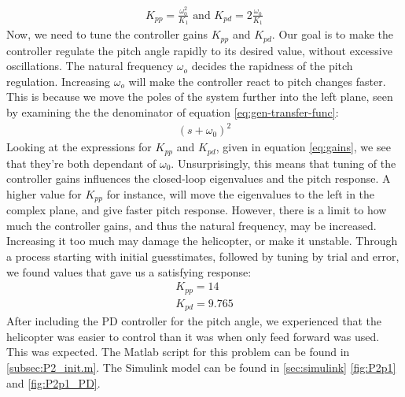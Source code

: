 \begin{gather}
    K_{pp} = \frac{\omega_0^2}{K_1} \text{ and } K_{pd} = 2 \frac{\omega_0}{K_1}
    \label{eq:gains}
\end{gather}
Now, we need to tune the controller gains $K_{pp}$ and $K_{pd}$. Our goal is to make the controller regulate the pitch angle rapidly to its desired value, without excessive oscillations. The natural frequency $\omega_o$ decides the rapidness of the pitch regulation. Increasing $\omega_o$ will make the controller react to pitch changes faster. This is because we move the poles of the system further into the left plane, seen by examining the the denominator of equation \eqref{eq:gen-transfer-func}:
\begin{gather*}
    (s + \omega_0)^2
\end{gather*}
 Looking at the expressions for  $K_{pp}$ and $K_{pd}$, given in equation \eqref{eq:gains}, we see that they're both dependant of $\omega_0$. Unsurprisingly, this means that tuning of the controller gains influences the closed-loop eigenvalues and the pitch response. A higher value for $K_{pp}$ for instance, will move the eigenvalues to the left in the complex plane, and give faster pitch response. However, there is a limit to how much the controller gains, and thus the natural frequency, may be increased. Increasing it too much may damage the helicopter, or make it unstable. 
 Through a process starting with initial guesstimates, followed by tuning by trial and error, we found values that gave us a satisfying response:
\begin{gather*}
    K_{pp} = 14 \\ 
    K_{pd} = 9.765
\end{gather*}
After including the PD controller for the pitch angle, we experienced that the helicopter was easier to control than it was when only feed forward was used. This was expected. The Matlab script for this problem can be found in \cref{subsec:P2_init.m}. The Simulink model can be found in \cref{sec:simulink} \cref{fig:P2p1} and \cref{fig:P2p1_PD}.

